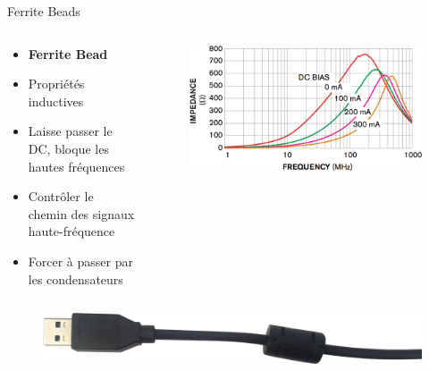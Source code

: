 \begin{frame}{Ferrite Beads}
    \begin{columns}
        \begin{column}{0.5\textwidth}
            \begin{itemize}
                \item \textbf{Ferrite Bead}
                \item Propriétés inductives
                \item Laisse passer le DC, bloque les hautes fréquences
                \bigskip
                \item Contrôler le chemin des signaux haute-fréquence
                \item Forcer à passer par les condensateurs
            \end{itemize}
        \end{column}

        \begin{column}{0.5\textwidth}
            \begin{center}

                \begin{figure}
                    \includegraphics[width=\textwidth, height=0.66\textheight, keepaspectratio]{pictures/ferrite-bead-impedance.png}
                \end{figure}
            \end{center}
        \end{column}
    \end{columns}

    \begin{figure}
        \includegraphics[width=\textwidth, height=0.75\textheight, keepaspectratio]{pictures/ferrite-bead-cable.png}
    \end{figure}
\end{frame}


